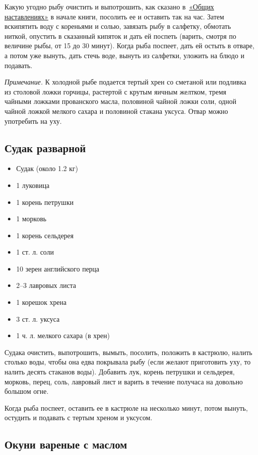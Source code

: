 Какую угодно рыбу очистить и выпотрошить, как сказано в~\hyperref[0sec:obsch-nast]{«Общих наставлениях»} в начале книги, посолить ее и оставить так на час. Затем вскипятить воду с кореньями и солью, завязать рыбу в салфетку, обмотать ниткой, опустить в сказанный кипяток и дать ей поспеть (варить, смотря по величине рыбы, от 15 до 30 минут). Когда рыба поспеет, дать ей остыть в отваре, а потом уже вынуть, дать стечь воде, вынуть из салфетки, уложить на блюдо и подавать.

\emph{Примечание.} К холодной рыбе подается тертый хрен со сметаной или подливка из столовой ложки горчицы, растертой с крутым яичным желтком, тремя чайными ложками прованского масла, половиной чайной ложки соли, одной чайной ложкой мелкого сахара и половиной стакана уксуса. Отвар можно употребить на уху.

\subsection{Судак разварной}

\begin{itemize}
	\item Судак (около 1.2 кг) 
    \item 1 луковица 
    \item 1 корень петрушки 
    \item 1 морковь 
    \item 1 корень сельдерея
    \item 1 ст. л. соли
    \item 10 зерен английского перца
    \item 2–3 лавровых листа
    \item 1 корешок хрена
    \item 3 ст. л. уксуса
    \item 1 ч. л. мелкого сахара (в хрен)
\end{itemize}

Судака очистить, выпотрошить, вымыть, посолить, положить в кастрюлю, налить столько воды, чтобы она едва покрывала рыбу (если желают приготовить уху, то налить десять стаканов воды). Добавить лук, корень петрушки и сельдерея, морковь, перец, соль, лавровый лист и варить в течение получаса на довольно большом огне.

Когда рыба поспеет, оставить ее в кастрюле на несколько минут, потом вынуть, остудить и подавать с тертым хреном и уксусом.

\subsection{Окуни вареные с маслом}

